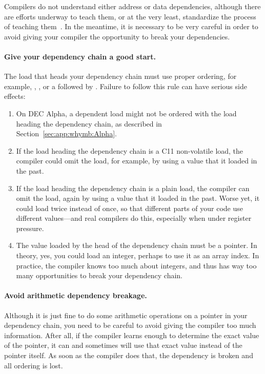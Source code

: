 Compilers do not understand either address or data dependencies,
although there are efforts underway to teach them, or at the very
least, standardize the process of teaching
them~\cite{PaulEMcKennneyConsumeP0190R0,PaulEMcKenney2017markconsumeP0462R1}.
In the meantime, it is necessary to be very careful in order to avoid
giving your compiler the opportunity to break your dependencies.

\paragraph{Give your dependency chain a good start.}
The load that heads your dependency chain must use proper
ordering, for example, ,
, or
a  followed by .
Failure to follow this rule can have serious side effects:

\begin{enumerate}
\item	On DEC Alpha, a dependent load might not be ordered with
	the load heading the dependency chain, as described in
	Section~\ref{sec:app:whymb:Alpha}.
\item	If the load heading the dependency chain is a
	C11 non-volatile  load,
	the compiler could omit the load, for example, by using a value
	that it loaded in the past.
\item	If the load heading the dependency chain is a plain load,
	the compiler can omit the load, again by using a value
	that it loaded in the past.
	Worse yet, it could load twice instead of once, so that
	different parts of your code use different values---and
	real compilers do this, especially when under register
	pressure.
\item	The value loaded by the head of the dependency chain must
	be a pointer.
	In theory, yes, you could load an integer, perhaps to use
	it as an array index.
	In practice, the compiler knows too much about integers,
	and thus has way too many opportunities to break your
	dependency chain.
\end{enumerate}

\paragraph{Avoid arithmetic dependency breakage.}
Although it is just fine to do some arithmetic operations on a pointer in
your dependency chain, you need to be careful to avoid giving the
compiler too much information.
After all, if the compiler learns enough to determine the exact value
of the pointer, it can and sometimes will use that exact value instead
of the pointer itself.
As soon as the compiler does that, the dependency is broken and all
ordering is lost.

